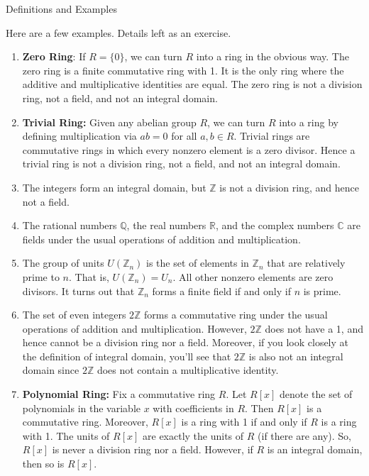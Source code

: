\begin{section}{Definitions and Examples}
\begin{example}
Here are a few examples.  Details left as an exercise.
\begin{enumerate}[label=\textrm{(\alph*)}]
\item \textbf{Zero Ring}: If $R=\{0\}$, we can turn $R$ into a ring in the obvious way.  The zero ring is a finite commutative ring with 1.  It is the only ring where the additive and multiplicative identities are equal.  The zero ring is not a division ring, not a field, and not an integral domain.
\item \textbf{Trivial Ring:} Given any abelian group $R$, we can turn $R$ into a ring by defining multiplication via $ab=0$ for all $a,b\in R$. Trivial rings are commutative rings in which every nonzero element is a zero divisor.  Hence a trivial ring is not a division ring, not a field, and not an integral domain.
\item 
The integers form an integral domain, but $\mathbb{Z}$ is not a division ring, and hence not a field.
\item The rational numbers $\mathbb{Q}$, the real numbers $\mathbb{R}$, and the complex numbers $\mathbb{C}$ are fields under the usual operations of addition and multiplication.
\item 
The group of units $U(\mathbb{Z}_n)$ is the set of elements in $\mathbb{Z}_n$ that are relatively prime to $n$. That is, $U(\mathbb{Z}_n)=U_n$.  All other nonzero elements are zero divisors.  It turns out that $\mathbb{Z}_n$ forms a finite field if and only if $n$ is prime.
\item The set of even integers $2\mathbb{Z}$ forms a commutative ring under the usual operations of addition and multiplication.  However, $2\mathbb{Z}$ does not have a 1, and hence cannot be a division ring nor a field.  Moreover, if you look closely at the definition of integral domain, you'll see that $2\mathbb{Z}$ is also not an integral domain since $2\mathbb{Z}$ does not contain a multiplicative identity.
\item \textbf{Polynomial Ring:} Fix a commutative ring $R$.  Let $R[x]$ denote the set of polynomials in the variable $x$ with coefficients in $R$.  Then $R[x]$ is a commutative ring. Moreover, $R[x]$ is a ring with 1 if and only if $R$ is a ring with 1. The units of $R[x]$ are exactly the units of $R$ (if there are any). So, $R[x]$ is never a division ring nor a field.  However, if $R$ is an integral domain, then so is $R[x]$. 

\end{enumerate}
\end{example}
\end{section}
